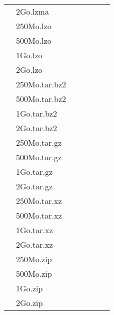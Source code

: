 \documentclass{article}           %
\begin{document}
\begin{table}[ht!]
\begin{normalsize}
\begin{center}
\begin{tabular}{|l|l|c|c|c|c|c|}
    	\cline{2-7}
    			& 2Go.lzma &  &  &  &  &  \\
    \cline{2-7}
    			& 250Mo.lzo &  &  &  &  &  \\
    \cline{2-7}
    			& 500Mo.lzo &  &  &  &  &  \\
    	\cline{2-7}
    			& 1Go.lzo &  &  &  &  &  \\
    	\cline{2-7}
    			& 2Go.lzo &  &  &  &  &  \\
    	\cline{2-7}
    			& 250Mo.tar.bz2 &  &  &  &  &  \\
    \cline{2-7}
    			& 500Mo.tar.bz2 &  &  &  &  &  \\
    	\cline{2-7}
    			& 1Go.tar.bz2 &  &  &  &  &  \\
    	\cline{2-7}
    			& 2Go.tar.bz2 &  &  &  &  &  \\
    	\cline{2-7}
    			& 250Mo.tar.gz &  &  &  &  &  \\
    \cline{2-7}
    			& 500Mo.tar.gz &  &  &  &  &  \\
    	\cline{2-7}
    			& 1Go.tar.gz &  &  &  &  &  \\
    	\cline{2-7}
    			& 2Go.tar.gz &  &  &  &  &  \\
    	\cline{2-7}
    			& 250Mo.tar.xz &  &  &  &  &  \\
    \cline{2-7}
    			& 500Mo.tar.xz &  &  &  &  &  \\
    	\cline{2-7}
    			& 1Go.tar.xz &  &  &  &  &  \\
    	\cline{2-7}
    			& 2Go.tar.xz &  &  &  &  &  \\
    	\cline{2-7}
    			& 250Mo.zip &  &  &  &  &  \\
    \cline{2-7}
    			& 500Mo.zip &  &  &  &  &  \\
    	\cline{2-7}
    			& 1Go.zip &  &  &  &  &  \\
    	\cline{2-7}
    			& 2Go.zip &  &  &  &  &  \\
    \hline
\end{tabular}
\end{center}
\end{normalsize}
\end{table}
\end{document}
